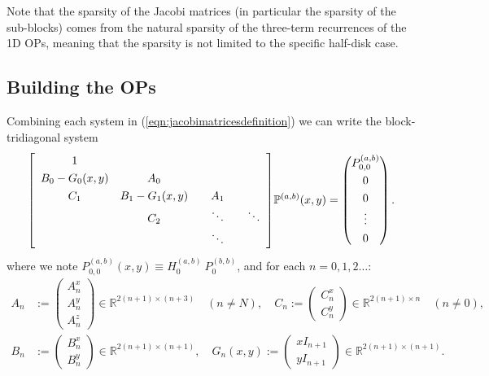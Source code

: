 \documentclass[11pt, oneside]{article}   	%
\newcommand{\R}{\mathbb{R}}
\newcommand{\bigP}{\mathbb{P}}
\newcommand{\bigPab}{\bigP^{(a,b)}}
\begin{document}
Note that the sparsity of the Jacobi matrices (in particular the sparsity of the sub-blocks) comes from the natural sparsity of the three-term recurrences of the 1D OPs, meaning that the sparsity is not limited to the specific half-disk case.




\subsection{Building the OPs} 

Combining each system in (\ref{eqn:jacobimatricesdefinition}) we can write the block-tridiagonal system
\begin{align}
\renewcommand\arraystretch{1.3}
\mleft[
\begin{array}{cccc}
		1 & & & \\
		B_0-G_0(x,y) & A_0 & & \\
		C_1 & B_1-G_1(x,y) & \quad A_1 \quad & \\
		& C_2 & \ddots & \ddots \\
		& & \ddots &
\end{array}
\mright]
\bigPab(x,y)
=
\begin{pmatrix}
	P^{(a,b)}_{0,0} \\ 0 \\ 0 \\ \vdots \\ 0 \\
\end{pmatrix}.
\end{align}
where we note \(P^{(a,b)}_{0,0}(x,y) \equiv H_0^{(a,b)} \: P_0^{(b,b)}\), and for each $n = 0,1,2\dots$:
\begin{align}
A_n &:= \begin{pmatrix}
		A^x_n \\
		A^y_n \\
		A^z_n
	    \end{pmatrix} \in \R^{2(n+1)\times(n+3)} \quad (n \ne N), \quad
C_n := \begin{pmatrix}
		C^x_n \\
		C^y_n
	    \end{pmatrix} \in \R^{2(n+1)\times n} \quad (n \ne 0), \nonumber \\
B_n &:= \begin{pmatrix}
		B^x_n \\
		B^y_n
	    \end{pmatrix} \in \R^{2(n+1)\times(n+1)}, \quad
G_n(x,y) := \begin{pmatrix}
		xI_{n+1} \\
		yI_{n+1}
	    \end{pmatrix} \in \R^{2(n+1)\times(n+1)}.
\end{align}
 
\end{document}
